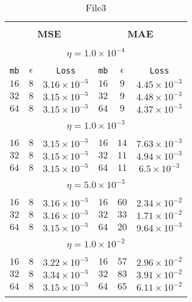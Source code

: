 \begin{table}[]
  \small
  
\begin{center}
\caption{File3}\label{tab:mae1}
\begin{tabular}{@{}ccc|ccc@{}}

\hline\\[-11pt]
\hline\\[-6.5pt]
\multicolumn{3}{c}{\bf MSE} & \multicolumn{3}{c}{\bf MAE } \\[5pt]
\hline\\[-11pt]
\multicolumn{6}{c}{$\eta = 1.0\times 10^{-4}$} \\[5pt]
\hline\\[-11pt]
\texttt{mb} & \texttt{$\epsilon$} & \texttt{Loss} & \texttt{mb} & \texttt{$\epsilon$} & \texttt{Loss} \\[1pt]
$16$ & $8$ & $3.16\times 10^{-5}$  & $16$ & $9$ & $4.45\times 10^{-3}$  \\ [1pt]
$32$ & $8$ & $3.15\times 10^{-5}$  & $32$ & $9$ & $4.48\times 10^{-3}$ \\ [1pt]
$64$ & $8$ & $3.15\times 10^{-5}$  & $64$ & $9$ & $4.37\times 10^{-3}$   \\[1pt]
\hline\\[-11pt]
\multicolumn{6}{c}{$\eta = 1.0\times 10^{-3}$} \\[5pt]
\hline\\[-11pt]
$16$ & $8$ & $3.15\times 10^{-5}$  & $16$ & $14$ & $7.63\times 10^{-3}$  \\ [1pt]
$32$ & $8$ & $3.15\times 10^{-5}$  & $32$ & $11$ & $4.94\times 10^{-3}$  \\ [1pt]
$64$ & $8$ & $3.15\times 10^{-5}$  & $64$ & $11$ & $6.5\times 10^{-3}$   \\ [1pt]
\hline\\[-11pt]
\multicolumn{6}{c}{$\eta = 5.0\times 10^{-3}$} \\[5pt]
\hline\\[-11pt]
$16$ & $8$ & $3.16\times 10^{-5}$  & $16$ & $60$ & $2.34\times 10^{-2}$  \\ [1pt]
$32$ & $8$ & $3.16\times 10^{-5}$  & $32$ & $33$ & $1.71\times 10^{-2}$  \\ [1pt]
$64$ & $8$ & $3.15\times 10^{-5}$  & $64$ & $20$ & $9.64\times 10^{-3}$  \\ [1pt]
\hline\\[-11pt]

\multicolumn{6}{c}{$\eta = 1.0\times 10^{-2}$} \\[5pt]
\hline\\[-11pt]
$16$ & $8$ & $3.22\times 10^{-5}$  & $16$ & $57$ & $2.96\times 10^{-2}$  \\ [1pt]
$32$ & $8$ & $3.34\times 10^{-5}$  & $32$ & $83$ & $3.91\times 10^{-2}$  \\ [1pt]
$64$ & $8$ & $3.15\times 10^{-5}$  & $64$ & $65$ & $6.11\times 10^{-2}$  \\ [1pt]
\hline\\[-11pt]


\end{tabular}
\end{center}
\end{table}
